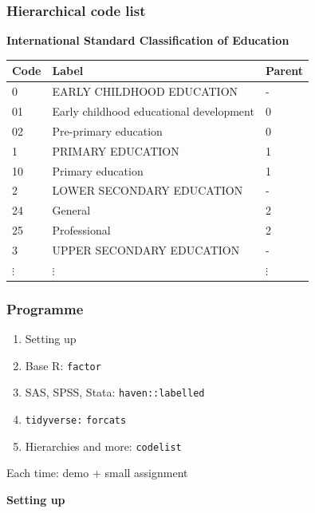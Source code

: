 \documentclass[aspectratio=1610]{beamer}
\newcommand{\rcode}[1]{\texttt{\footnotesize #1}}
\begin{document}
\begin{frame}
  \frametitle{Hierarchical code list}
  \begin{center}
  \textbf{International Standard Classification of Education}
  \begin{tabular}{lll}
    \toprule
    Code & Label & Parent\\
    \midrule
    0  &EARLY CHILDHOOD EDUCATION & -\\
    01 &Early childhood educational development & 0\\
    02 &Pre-primary education & 0\\
    1  &PRIMARY EDUCATION & 1\\
    10 &Primary education & 1\\
    2  &LOWER SECONDARY EDUCATION & -\\
    24 &General & 2\\
    25 &Professional & 2\\
    3  &UPPER SECONDARY EDUCATION & -\\
    $\vdots$ &$\vdots$ & $\vdots$\\
    \bottomrule
  \end{tabular}
  \end{center}
\end{frame}

\invert
\begin{frame}
  \frametitle{Programme}
  \begin{enumerate}
    \item Setting up
    \item Base R: \rcode{factor}
    \item SAS, SPSS, Stata: \rcode{haven::labelled}
    \item \texttt{tidyverse:} \rcode{forcats}
    \item Hierarchies and more: \rcode{codelist}
  \end{enumerate}
  Each time: demo + small assignment
\end{frame}
\revert

\invert
\begin{frame}
   \LARGE \textbf{Setting up}
   \par
\end{frame}
\revert
\end{document}
